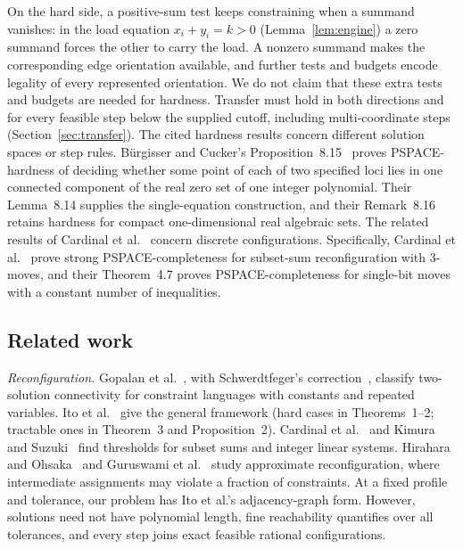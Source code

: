On the hard side, a positive-sum test keeps constraining when a summand
vanishes: in the load equation $x_i+y_i=k>0$ (Lemma~\ref{lem:engine}) a zero
summand forces the other to carry the load.
A nonzero summand makes the corresponding edge orientation available, and
further tests and budgets encode legality of every represented orientation.
We do not claim that these extra tests and budgets are needed for hardness.
Transfer must hold in both directions and for every feasible step below the
supplied cutoff, including multi-coordinate steps (Section~\ref{sec:transfer}).
The cited hardness results concern different solution spaces or step rules.
Bürgisser and Cucker's Proposition~8.15~\cite{burgissercucker} proves
PSPACE-hardness of deciding whether some point of each of two specified loci lies in one connected
component of the real zero set of one integer polynomial. Their Lemma~8.14
supplies the single-equation construction, and their Remark~8.16 retains
hardness for compact one-dimensional real algebraic sets. The related
results of Cardinal et al.~\cite{cardinal} concern discrete configurations.
Specifically, Cardinal et al.~\cite[Theorem~3.3]{cardinal} prove strong
PSPACE-completeness for subset-sum reconfiguration with 3-moves, and their
Theorem~4.7 proves PSPACE-completeness for single-bit moves with a constant
number of inequalities.

\subsection{Related work}\label{sec:related}

\emph{Reconfiguration.} Gopalan et al.~\cite{gopalan}, with Schwerdtfeger's
correction~\cite{schwerdtfeger}, classify two-solution connectivity for
constraint languages with constants and repeated variables. Ito et
al.~\cite[Section~1]{ito} give the general framework (hard cases in
Theorems~1--2; tractable ones in Theorem~3 and Proposition~2). Cardinal et
al.~\cite{cardinal} and Kimura and Suzuki~\cite{kimurasuzuki} find thresholds
for subset sums and integer linear systems. Hirahara and
Ohsaka~\cite{hiraharaohsaka} and Guruswami et al.~\cite{guruswami} study
approximate reconfiguration, where intermediate assignments may violate a
fraction of constraints. At a fixed profile and tolerance, our problem has
Ito et al.'s adjacency-graph form. However, solutions need not have
polynomial length, fine reachability quantifies over all tolerances, and
every step joins exact feasible rational configurations.

